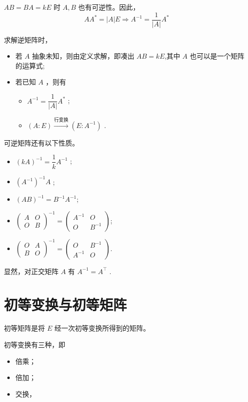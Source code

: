$ AB = BA = kE $ 时 $ A,B $ 也有可逆性。因此，
$$
    AA^* = |A|E \Rightarrow 
    A^{-1} = \dfrac{1}{|A|} A^*
$$ 

求解逆矩阵时，
\begin{itemize}
    \item 若 $ A $ 抽象未知，则由定义求解，即凑出 $ AB = kE $,其中
    $ A $ 也可以是一个矩阵的运算式;
    \item 若已知 $ A $ ，则有
    \begin{itemize}
        \item $ A^{-1} = \dfrac{1}{|A|} A^* $ ;
        \item $ (A:E)\xrightarrow{\textrm{行变换}}(E:A^{-1}) $ .
    \end{itemize}
\end{itemize}

可逆矩阵还有以下性质。
\begin{itemize}
    \item $ (kA)^{-1} = \dfrac{1}{k}A^{-1} $ ;
    \item $ (A^{-1})^{-1} A $ ;
    \item $ (AB)^{-1} = B^{-1}A^{-1} $;
    \item $ \begin{pmatrix}
        A&O\\O&B
    \end{pmatrix}^{-1} = \begin{pmatrix}
        A^{-1}&O\\O&B^{-1}
    \end{pmatrix} $;
    \item $ \begin{pmatrix}
        O&A\\B&O
    \end{pmatrix}^{-1} = \begin{pmatrix}
        O&B^{-1}\\A^{-1}&O
    \end{pmatrix} $.
\end{itemize}

显然，对正交矩阵 $ A $ 有 $ A^{-1} = A^\top $ .

\section{初等变换与初等矩阵}

初等矩阵是将 $ E $ 经一次初等变换所得到的矩阵。

初等变换有三种，即
\begin{itemize}
    \item 倍乘；
    \item 倍加；
    \item 交换，
\end{itemize}

